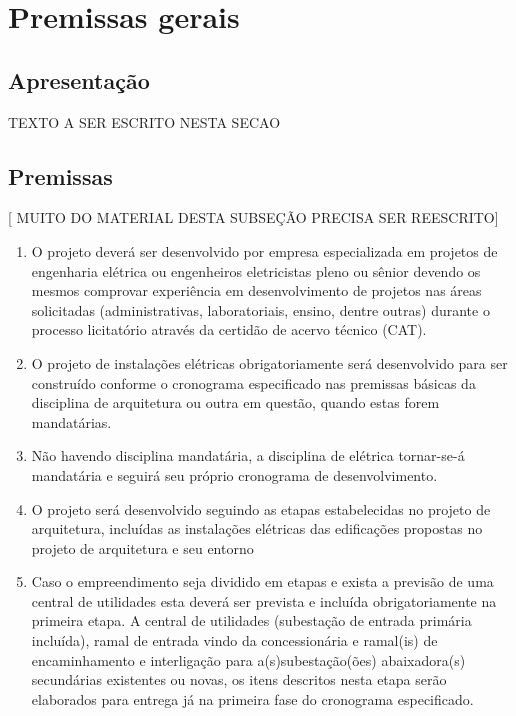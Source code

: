 \section{Premissas gerais} \label{section: general settings}
\subsection{Apresentação}
TEXTO A SER ESCRITO NESTA SECAO

\subsection{Premissas}

[ MUITO DO MATERIAL DESTA SUBSEÇÃO PRECISA SER REESCRITO]

\begin{enumerate}
	\item O projeto deverá ser desenvolvido por empresa especializada em projetos de engenharia elétrica ou engenheiros eletricistas pleno ou sênior devendo os mesmos comprovar experiência em desenvolvimento de projetos nas áreas solicitadas (administrativas, laboratoriais, ensino, dentre outras) durante o processo licitatório através da certidão de acervo técnico (CAT).
	
	\item O projeto de instalações elétricas obrigatoriamente será desenvolvido para ser construído conforme o cronograma especificado nas premissas básicas da disciplina de arquitetura ou outra em questão, quando estas forem mandatárias.
	
	\item Não havendo disciplina mandatária, a disciplina de elétrica tornar-se-á mandatária e seguirá seu próprio cronograma de desenvolvimento.
	
	\item O projeto será desenvolvido seguindo as etapas estabelecidas no projeto de arquitetura, incluídas as instalações elétricas das edificações propostas no projeto de arquitetura e seu entorno
	
	\item Caso o empreendimento seja dividido em etapas e exista a previsão de uma central de utilidades esta deverá ser prevista e incluída obrigatoriamente na primeira etapa. A central de utilidades (subestação de entrada primária incluída), ramal de entrada vindo da concessionária e ramal(is) de encaminhamento e interligação para a(s)subestação(ões) abaixadora(s) secundárias existentes ou novas, os itens descritos nesta etapa serão elaborados para entrega já na primeira fase do cronograma especificado.
	

\end{enumerate}
